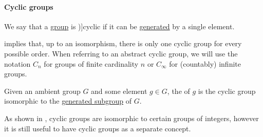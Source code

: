 \paragraph{Cyclic groups}

\begin{definition}\label{def:cyclic_group}
  We say that a \hyperref[def:group]{group} is \term[ru=циклическая группа (\cite[97]{Тыртышников2017Алгебра})]{cyclic} if it can be \hyperref[def:object_presentation]{generated} by a single element.

   implies that, up to an isomorphism, there is only one cyclic group for every possible order. When referring to an abstract cyclic group, we will use the notation \( C_n \) for groups of finite cardinality \( n \) or \( C_\infty \) for (countably) infinite groups.
\end{definition}
\begin{comments}
  \item Given an ambient group \( G \) and some element \( g \in G \), the  of \( g \) is the cyclic group isomorphic to the \hyperref[def:group/submodel]{generated subgroup} of \( G \).

  \item As shown in , cyclic groups are isomorphic to certain groups of integers, however it is still useful to have cyclic groups as a separate concept.
\end{comments}

